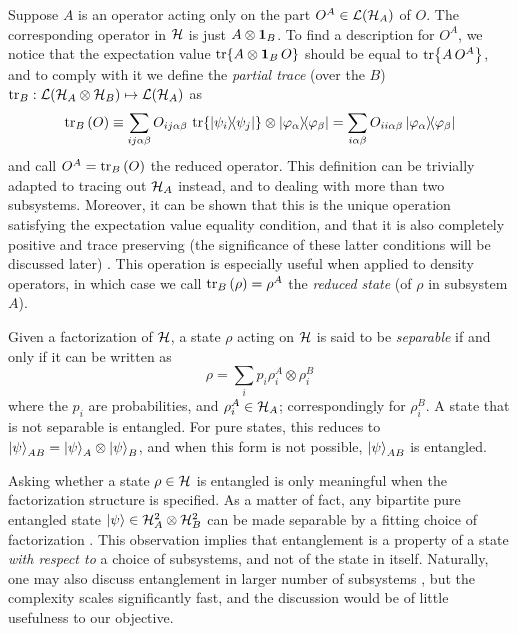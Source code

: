 		Suppose $A$ is an operator acting only on the part $O^A \in \mathcal{L}(\mathcal{H}_A)$ of $O$. The corresponding operator in $\mathcal{H}$ is just $A \otimes \mathbf{1}_B$. To find a description for $O^A$, we notice that the expectation value $\tr{A \otimes \mathbf{1}_B \,O}$ should be equal to $\tr{ A \,O^A}$, and to comply with it we define the \emph{partial trace} (over the $B$) $\text{tr}_B : \mathcal{L}(\mathcal{H}_A \otimes \mathcal{H}_B) \mapsto \mathcal{L}(\mathcal{H}_A)$ as
		$$
			\text{tr}_{B}\left( O \right) \equiv \sum_{ij\alpha\beta} O_{ij\alpha\beta} \,\tr{\ketbra{\psi_i}{\psi_j}} \otimes \ketbra{\varphi_\alpha}{\varphi_\beta} = \sum_{i\alpha\beta} O_{ii\alpha\beta} \ketbra{\varphi_\alpha}{\varphi_\beta}
		$$
		and call $O^A = \text{tr}_{B}\left( O \right)$ the reduced operator. This definition can be trivially adapted to tracing out $\mathcal{H}_A$ instead, and to dealing with more than two subsystems. Moreover, it can be shown that this is the unique operation satisfying the expectation value equality condition, and that it is also completely positive and trace preserving (the significance of these latter conditions will be discussed later) \cite{}. This operation is especially useful when applied to density operators, in which case we call $\text{tr}_{B}\left( \rho \right) = \rho^A$ the \emph{reduced state} (of $\rho$ in subsystem $A$).
	
		Given a factorization of $\mathcal{H}$, a state $\rho$ acting on $\mathcal{H}$ is said to be \emph{separable} if and only if it can be written as 
		$$
			\rho = \sum_i p_i \rho_i^A \otimes \rho_i^B
			\label{eq:separable-state}
		$$
		where the $p_i$ are probabilities, and $\rho_i^A \in \mathcal{H}_A$; correspondingly for $\rho_i ^B$. A state that is not separable is entangled. For pure states, this reduces to $\ket{\psi}_{AB} = \ket{\psi}_A \otimes \ket{\psi}_B$, and when this form is not possible, $\ket{\psi}_{AB}$ is entangled. 
	
		Asking whether a state $\rho \in \mathcal{H}$ is entangled is only meaningful when the factorization structure is specified. As a matter of fact, any bipartite pure entangled state $\ket{\psi} \in \mathcal{H}^{2}_A \otimes \mathcal{H}^{2}_B$ can be made separable by a fitting choice of factorization \cite{terra_2007_singleparticle}. This observation implies that entanglement is a property of a state \emph{with respect to} a choice of subsystems, and not of the state in itself. Naturally, one may also discuss entanglement in larger number of subsystems \cite{horodecki_2009_entanglement}, but the complexity scales significantly fast, and the discussion would be of little usefulness to our objective.
	
